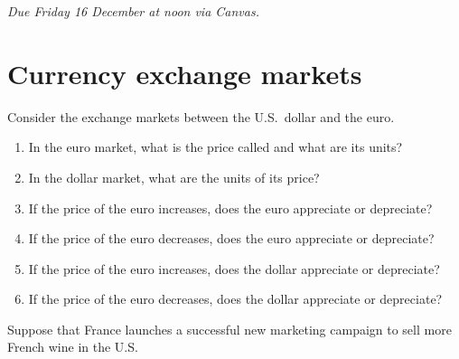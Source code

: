 \documentclass{assignment}
\date{Friday 9 December 2022}
\begin{document}
\RaggedRight

\beginassignment{}

\emph{Due Friday 16 December at noon via Canvas.}

\section{Currency exchange markets}

Consider the exchange markets between the U.S.~dollar and the euro.

\begin{enumerate}

\item In the euro market, what is the price called and what are its units?

\vfill

\item In the dollar market, what are the units of its price?

\vfill

\item If the price of the euro increases, does the euro appreciate or depreciate?

\vfill

\item If the price of the euro decreases, does the euro appreciate or depreciate?

\vfill

\item If the price of the euro increases, does the dollar appreciate or depreciate?

\vfill

\item If the price of the euro decreases, does the dollar appreciate or depreciate?

\vfill

\end{enumerate}

\vspace{-2.0\baselineskip}

\clearpage

Suppose that France launches a successful new marketing campaign to sell more French wine in the U.S.
\end{document}
